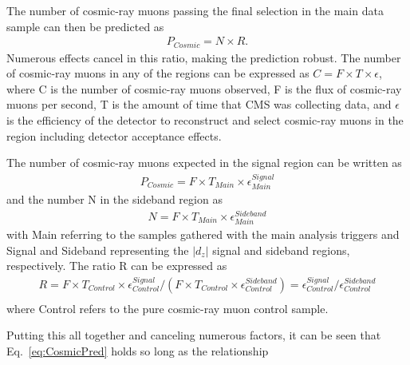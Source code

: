 The number of cosmic-ray muons passing the final selection in the main data sample can then be predicted as 
\begin{equation}
\begin{split}
P_{Cosmic} = N \times R.
\end{split}
\label{eq:CosmicPred}
\end{equation}
Numerous effects cancel in this ratio, making the prediction robust. The number of cosmic-ray muons in any of the regions can be expressed as 
$C = F \times T \times \epsilon$, where C is the number of cosmic-ray muons observed, F is the flux of cosmic-ray muons per second, T is the amount of time that CMS was collecting data, and $\epsilon$ is the efficiency of the detector to reconstruct and select cosmic-ray muons in the region including detector acceptance effects. 

The number of cosmic-ray muons expected in the signal region can be written as
\begin{equation}
\begin{split}
P_{Cosmic} = F \times T_{Main} \times \epsilon_{Main}^{Signal}
\end{split}
\label{eq:CosmicSignal}
\end{equation}
and the number N in the sideband region as 
\begin{equation}
\begin{split}
N = F \times T_{Main} \times \epsilon_{Main}^{Sideband}
\end{split}
\label{eq:CosmicSide}
\end{equation}
with Main referring to the samples gathered with the main analysis triggers
and Signal and Sideband representing the $|d_z|$ signal and sideband regions, respectively.
The ratio R can be expressed as
\begin{equation}
\begin{split}
R = F \times T_{Control} \times \epsilon_{Control}^{Signal} / (F \times T_{Control} \times \epsilon_{Control}^{Sideband}) = \epsilon_{Control}^{Signal} / \epsilon_{Control}^{Sideband}\\
\end{split}
\label{eq:CosmicRatio}
\end{equation}
where Control refers to the pure cosmic-ray muon control sample.

Putting this all together and canceling numerous factors, it can be seen that Eq.~\ref{eq:CosmicPred} holds so long as the relationship

